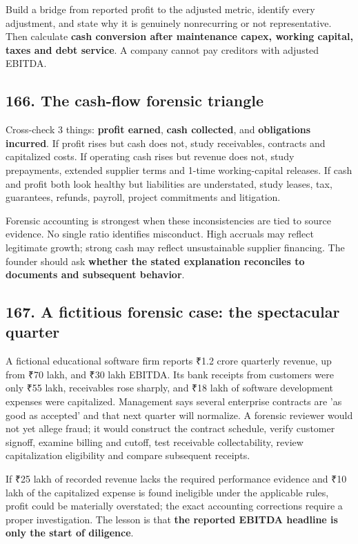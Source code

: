 Build a bridge from reported profit to the adjusted metric, identify every adjustment, and state why it is genuinely nonrecurring or not representative. Then calculate \textbf{cash conversion after maintenance capex, working capital, taxes and debt service}. A company cannot pay creditors with adjusted EBITDA.

\subsection{166. The cash-flow forensic triangle}


Cross-check 3 things: \textbf{profit earned}, \textbf{cash collected}, and \textbf{obligations incurred}. If profit rises but cash does not, study receivables, contracts and capitalized costs. If operating cash rises but revenue does not, study prepayments, extended supplier terms and 1-time working-capital releases. If cash and profit both look healthy but liabilities are understated, study leases, tax, guarantees, refunds, payroll, project commitments and litigation.

Forensic accounting is strongest when these inconsistencies are tied to source evidence. No single ratio identifies misconduct. High accruals may reflect legitimate growth; strong cash may reflect unsustainable supplier financing. The founder should ask \textbf{whether the stated explanation reconciles to documents and subsequent behavior}.

\subsection{167. A fictitious forensic case: the spectacular quarter}


A fictional educational software firm reports ₹1.2 crore quarterly revenue, up from ₹70 lakh, and ₹30 lakh EBITDA. Its bank receipts from customers were only ₹55 lakh, receivables rose sharply, and ₹18 lakh of software development expenses were capitalized. Management says several enterprise contracts are 'as good as accepted' and that next quarter will normalize. A forensic reviewer would not yet allege fraud; it would construct the contract schedule, verify customer signoff, examine billing and cutoff, test receivable collectability, review capitalization eligibility and compare subsequent receipts.

If ₹25 lakh of recorded revenue lacks the required performance evidence and ₹10 lakh of the capitalized expense is found ineligible under the applicable rules, profit could be materially overstated; the exact accounting corrections require a proper investigation. The lesson is that \textbf{the reported EBITDA headline is only the start of diligence}.

